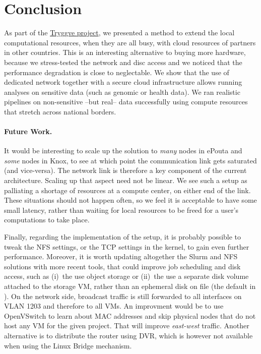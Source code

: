 \section{Conclusion}
\label{section:conclusion}

As part of the \href{https://wiki.neic.no/wiki/Tryggve}{Tryggve
  project}, we presented a method to extend the local computational
resources, when they are all busy, with cloud resources of partners in
other countries.
%
This is an interesting alternative to buying more hardware, because we
stress-tested the network and disc access and we noticed that the
performance degradation is close to neglectable.
%
We show that the use of dedicated network together with a secure cloud
infrastructure allows running analyses on sensitive data (such as
genomic or health data).
%
We ran realistic pipelines on non-sensitive --but real-- data
successfully using compute resources that stretch across national
borders.
%

\paragraph{Future Work.}
%
It would be interesting to scale up the solution to \emph{many} nodes
in ePouta and \emph{some} nodes in Knox, to see
at which point the communication link gets saturated (and vice-versa).
%
The network link is therefore a key component of the current
architecture.
%
Scaling up that aspect need not be linear. We see such a setup as
palliating a shortage of resources at a compute center, on either end
of the link. These situations should not happen often, so we feel it
is acceptable to have some small latency, rather than waiting for
local resources to be freed for a user's computations to take place.

%
Finally, regarding the implementation of the setup,
%
it is probably possible to tweak the NFS settings, or the TCP settings
in the kernel, to gain even further performance.
%
Moreover, it is worth updating altogether the Slurm and NFS solutions
with more recent tools, that could improve job scheduling and disk
access, such as (i)~the use object storage or (ii)~the use a separate
disk volume attached to the storage VM, rather than an ephemeral disk
on file (\ie the default in ).
%
On the network side, broadcast traffic is still forwarded to all
interfaces on VLAN 1203 and therefore to all VMs. An improvment would
be to use OpenVSwitch to learn about MAC addresses and skip physical
nodes that do not host any VM for the given project. That will improve
\emph{east-west} traffic. Another alternative is to distribute the
router using DVR, which is however not available when using the Linux
Bridge mechanism.

